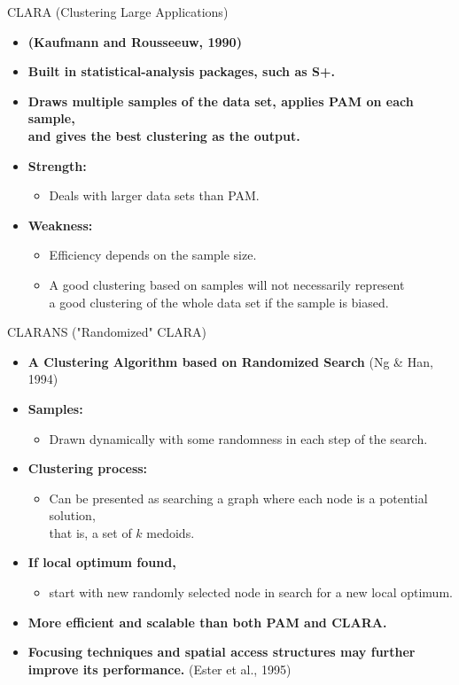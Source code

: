 \begin{frame}{CLARA (Clustering Large Applications)}
	\begin{itemize}
		\item \textbf{(Kaufmann and Rousseeuw, 1990)}
		\item \textbf{Built in statistical-analysis packages, such as S+.}
		\item \textbf{Draws multiple samples of the data set, applies PAM on 
		each sample,\\
			and gives the best clustering as the output.}
		\item \textbf{Strength:}
		\begin{itemize}
			\item Deals with larger data sets than PAM.
		\end{itemize}
		\item \textbf{Weakness:}
		\begin{itemize}
			\item Efficiency depends on the sample size.
			\item A good clustering based on samples will not necessarily 
			represent \\
			a good clustering of the whole data set if the sample is biased.
		\end{itemize}
	\end{itemize}
\end{frame}

\begin{frame}{CLARANS ("Randomized" CLARA)}
	\begin{itemize}
		\item \textbf{A Clustering Algorithm based on Randomized Search} (Ng \& 
		Han, 1994)
		\item \textbf{Samples:}
		\begin{itemize}
			\item Drawn dynamically with some randomness in each step of the 
			search.
		\end{itemize}
		\item \textbf{Clustering process:}
		\begin{itemize}
			\item Can be presented as searching a graph where each node is a 
			potential solution,\\
			that is, a set of $k$ medoids.
		\end{itemize}
		\item \textbf{If local optimum found,}
		\begin{itemize}
			\item start with new randomly selected node in search for a new 
			local optimum.
		\end{itemize}
		\item \textbf{More efficient and scalable than both PAM and CLARA.}
		\item \textbf{Focusing techniques and spatial access structures may 
		further improve its performance.} (Ester et al., 1995)
	\end{itemize}
\end{frame}